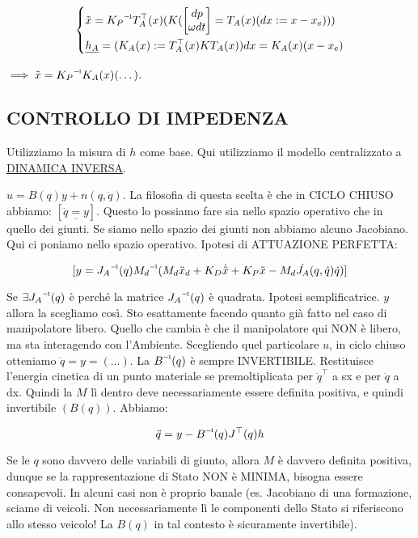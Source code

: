 \[	
	\left\{
	\begin{aligned}
	&\tilde{x} = \inv{K_P}T_A^\top(x)(K(\begin{bmatrix}dp\\\omega dt\end{bmatrix} = T_A(x)(dx := x-x_e)))\\
	&\underline{h_A} = (K_A(x) := T_A^\top(x)KT_A(x))dx = K_A(x)(x-x_e)
	\end{aligned}
	\right.
\]

$\implies \tilde{x}=\inv{K_P}K_A(x)(\dots)$.

\subsection{CONTROLLO DI IMPEDENZA}

Utilizziamo la misura di $h$ come base. \newline Qui utilizziamo il modello centralizzato a \underline{DINAMICA INVERSA}.

$u = B(q)y + n(q,\dot{q})$. La filosofia di questa scelta è che in CICLO CHIUSO abbiamo: $[\underline{\ddot{q}=y}]$. Questo lo possiamo fare sia nello spazio operativo che in quello dei giunti. Se siamo nello spazio dei giunti non abbiamo alcuno Jacobiano. Qui ci poniamo nello spazio operativo. Ipotesi di ATTUAZIONE PERFETTA:

\[
	[y = \inv{J_A}(q)\inv{M_d}(M_d\ddot{x}_d + K_D\dot{\tilde{x}} + K_P\tilde{x} - M_d\dot{J_A}(q,\dot{q})\dot{q})]
\]

Se $\exists\inv{J_A}(q)$ è perché la matrice $\inv{J_A}(q)$ è quadrata. Ipotesi semplificatrice. $y$ allora la scegliamo così. Sto esattamente facendo quanto già fatto nel caso di manipolatore libero. Quello che cambia è che il manipolatore qui NON è libero, ma sta interagendo con l'Ambiente. Scegliendo quel particolare $u$, in ciclo chiuso otteniamo $\ddot{q}=y=(\dots)$. La $\inv{B}(q)$ è sempre INVERTIBILE. Restituisce l'energia cinetica di un punto materiale se premoltiplicata per $\dot{q}^\top$ a sx e per $\dot{q}$ a dx. Quindi la $M$ lì dentro deve necessariamente essere definita positiva, e quindi invertibile $(B(q))$. Abbiamo:

\[
	\ddot{q} = y-\inv{B}(q)J^\top(q)h
\]

Se le $q$ sono davvero delle variabili di giunto, allora $M$ è davvero definita positiva, dunque se la rappresentazione di Stato NON è MINIMA, bisogna essere consapevoli. In alcuni casi non è proprio banale (es. Jacobiano di una formazione, sciame di veicoli. Non necessariamente lì le componenti dello Stato si riferiscono allo stesso veicolo! La $B(q)$ in tal contesto è sicuramente invertibile).

